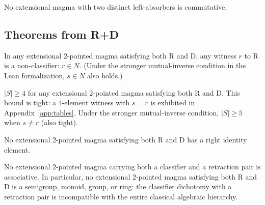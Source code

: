 \documentclass[a4paper,UKenglish,cleveref,autoref,thm-restate]{lipics-v2021}
\begin{document}
\begin{theorem}[Asymmetry]
\label{thm:asymmetry}
No extensional magma with two distinct left-absorbers is commutative.
\end{theorem}

\subsection{Theorems from R+D}

\begin{theorem}
\label{thm:placement}
In any extensional 2-pointed magma satisfying both R and D, any witness $r$ to R is a non-classifier: $r \in N$. (Under the stronger mutual-inverse condition in the Lean formalization, $s \in N$ also holds.)
\end{theorem}

\begin{theorem}
\label{thm:card}
$|S| \geq 4$ for any extensional 2-pointed magma satisfying both R and D. This bound is tight: a 4-element witness with $s = r$ is exhibited in Appendix~\ref{app:tables}. Under the stronger mutual-inverse condition, $|S| \geq 5$ when $s \neq r$ (also tight).
\end{theorem}

\begin{theorem}
\label{thm:no-rid}
No extensional 2-pointed magma satisfying both R and D has a right identity element.
\end{theorem}

\begin{theorem}[No Associativity]
\label{thm:no-assoc}
No extensional 2-pointed magma carrying both a classifier and a retraction pair is associative. In particular, no extensional 2-pointed magma satisfying both R and D is a semigroup, monoid, group, or ring: the classifier dichotomy with a retraction pair is incompatible with the entire classical algebraic hierarchy.
\end{theorem}
\end{document}
